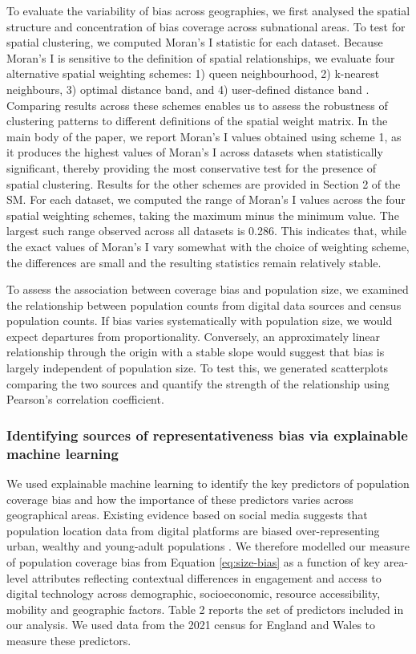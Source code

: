 \documentclass[]{rsos}%
\begin{document}
To evaluate the variability of bias across geographies, we first
analysed the spatial structure and concentration of bias coverage across subnational areas. To test for spatial clustering, we computed Moran's I statistic
for each dataset. Because Moran's I is sensitive to the definition of
spatial relationships, we evaluate four alternative spatial weighting
schemes: 1) queen neighbourhood, 2) k-nearest neighbours, 3) optimal distance
band, and 4) user-defined distance band \citep{rey2023}.
Comparing results across these schemes enables us to assess the
robustness of clustering patterns to different definitions of the
spatial weight matrix. In the main body of the paper, we report Moran's
I values obtained using scheme 1, as it produces the highest values of Moran's I across datasets when statistically significant, thereby providing the
most conservative test for the presence of spatial clustering. Results
for the other schemes are provided in Section 2 of the SM. For each dataset, we computed the range of Moran's I values across the four
spatial weighting schemes, taking the maximum minus the minimum value. The largest such
range observed across all datasets is 0.286. This indicates that, while
the exact values of Moran's I vary somewhat with the choice of weighting
scheme, the differences are small and the resulting statistics remain
relatively stable.

To assess the association between coverage bias and population size, we
examined the relationship between population counts from digital data
sources and census population counts. If bias varies systematically with
population size, we would expect departures from proportionality.
Conversely, an approximately linear relationship through the origin with
a stable slope would suggest that bias is largely independent of
population size. To test this, we generated scatterplots comparing the
two sources and quantify the strength of the relationship using
Pearson's correlation coefficient.

\subsubsection{Identifying sources of representativeness bias via explainable machine learning}\label{sec-eml}

We used explainable machine learning to identify the key predictors of
population coverage bias and how the importance of these predictors varies across
geographical areas. Existing evidence based on social media suggests
that population location data from digital platforms are biased
over-representing urban, wealthy and young-adult populations \citep{blumenstock2010, wesolowski13-biases, schlosser21-biases}.
We therefore modelled our measure of population coverage bias from
Equation \ref{eq:size-bias} as a function of key area-level attributes
reflecting contextual differences in engagement and access to digital
technology across demographic, socioeconomic, resource accessibility,
mobility and geographic factors. Table 2 reports the set of predictors
included in our analysis. We used data from the 2021 census for England
and Wales to measure these predictors.
\end{document}
